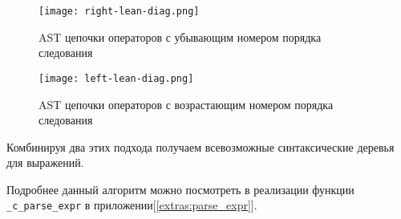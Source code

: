 


\begin{figure}[h!]
    \texttt{[image: right-lean-diag.png]}
    \centering
    \caption{AST цепочки операторов с убывающим номером порядка следования}
    \label{pratt:right-lean-diag}
\end{figure}
\begin{figure}[h!]
    \texttt{[image: left-lean-diag.png]}
    \centering
    \caption{AST цепочки операторов с возрастающим номером порядка следования}
    \label{pratt:left-lean-diag}
\end{figure}

\FloatBarrier


Комбинируя два этих подхода получаем всевозможные синтаксические деревья для выражений.

Подробнее данный алгоритм можно посмотреть в реализации функции \verb|_c_parse_expr| в приложении[\ref{extras:parse_expr}].



